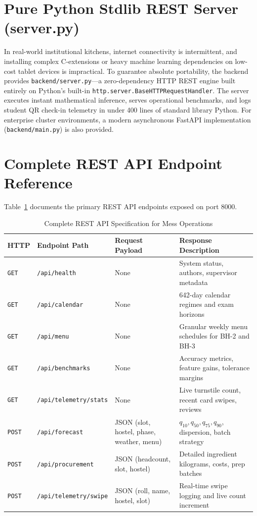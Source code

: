 \documentclass[11pt,a4paper,oneside]{report}
\begin{document}
\section{Pure Python Stdlib REST Server (server.py)}
In real-world institutional kitchens, internet connectivity is intermittent, and installing complex C-extensions or heavy machine learning dependencies on low-cost tablet devices is impractical. To guarantee absolute portability, the backend provides \texttt{backend/server.py}---a zero-dependency HTTP REST engine built entirely on Python's built-in \texttt{http.server.BaseHTTPRequestHandler}. The server executes instant mathematical inference, serves operational benchmarks, and logs student QR check-in telemetry in under 400 lines of standard library Python. For enterprise cluster environments, a modern asynchronous FastAPI implementation (\texttt{backend/main.py}) is also provided.

\section{Complete REST API Endpoint Reference}
Table~\ref{tab:api_endpoints} documents the primary REST API endpoints exposed on port 8000.

\begin{table}[ht]
\centering
\small
\renewcommand{\arraystretch}{1.2}
\begin{tabularx}{\textwidth}{llp{4.2cm}X}
\toprule
\rowcolor{bluelight}
\textbf{HTTP} & \textbf{Endpoint Path} & \textbf{Request Payload} & \textbf{Response Description} \\
\midrule
\texttt{GET} & \texttt{/api/health} & None & System status, authors, supervisor metadata \\
\texttt{GET} & \texttt{/api/calendar} & None & 642-day calendar regimes and exam horizons \\
\texttt{GET} & \texttt{/api/menu} & None & Granular weekly menu schedules for BH-2 and BH-3 \\
\texttt{GET} & \texttt{/api/benchmarks} & None & Accuracy metrics, feature gains, tolerance margins \\
\texttt{GET} & \texttt{/api/telemetry/stats} & None & Live turnstile count, recent card swipes, reviews \\
\texttt{POST} & \texttt{/api/forecast} & JSON (slot, hostel, phase, weather, menu) & $q_{10}, q_{50}, q_{75}, q_{90}$, dispersion, batch strategy \\
\texttt{POST} & \texttt{/api/procurement} & JSON (headcount, slot, hostel) & Detailed ingredient kilograms, costs, prep batches \\
\texttt{POST} & \texttt{/api/telemetry/swipe} & JSON (roll, name, hostel, slot) & Real-time swipe logging and live count increment \\
\bottomrule
\end{tabularx}
\caption{Complete REST API Specification for Mess Operations}
\label{tab:api_endpoints}
\end{table}
\end{document}
